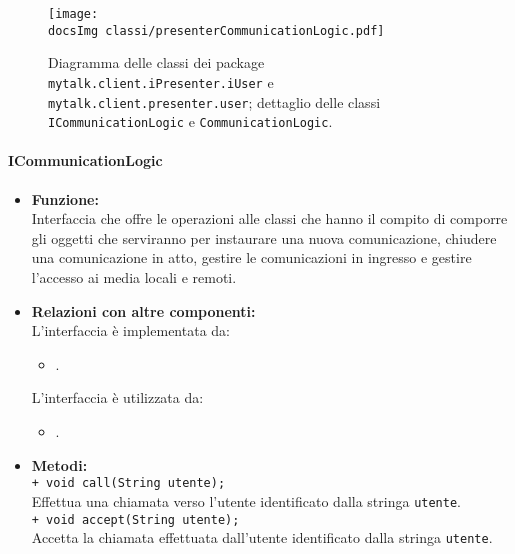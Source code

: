 {{\begin{sloppypar}
{{	\begin{figure}[h!tbp]
		\centering
		\label{fig:presenterCommunicationLogicUser}
		\texttt{[image: \\docsImg classi/presenterCommunicationLogic.pdf]}
\caption{Diagramma delle classi dei package \nolinkurl{mytalk.client.iPresenter.iUser} e  \nolinkurl{mytalk.client.presenter.user}; dettaglio delle classi \nolinkurl{ICommunicationLogic} e \nolinkurl{CommunicationLogic}.}		
	\end{figure}	
	
	
			\paragraph{ICommunicationLogic}\label{par:ICommunicationLogic}{
			\begin{itemize}
				\item[] \textbf{Funzione:}\\
					Interfaccia che offre le operazioni alle classi che hanno il compito di comporre gli oggetti che serviranno per instaurare una nuova comunicazione, chiudere una comunicazione in atto, gestire le comunicazioni in ingresso e gestire l'accesso ai media locali e remoti.\\
				
				\item[] \textbf{Relazioni con altre componenti:}\\
					L'interfaccia è implementata da:
					\begin{itemize}
						\item[]	.
					\end{itemize} 
					L'interfaccia è utilizzata da:
					\begin{itemize}
						\item[] .\\
					\end{itemize}
			
				\item[] \textbf{Metodi:}\\
					\texttt{+ void call(String utente);}\\
					Effettua una chiamata verso l'utente identificato dalla stringa \texttt{utente}. \\
					
					\texttt{+ void accept(String utente);} \\ 
					Accetta la chiamata effettuata dall'utente identificato dalla stringa \texttt{utente}.\\ 
					

\end{itemize}}}}
\end{sloppypar}}}
